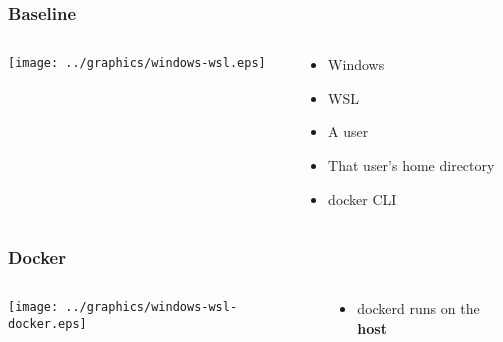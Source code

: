     \begin{frame}
      \frametitle{Baseline}
      \begin{columns}
        \begin{column}{0.5\textwidth}
          \texttt{[image: ../graphics/windows-wsl.eps]}
        \end{column}
        \begin{column}{0.5\textwidth}
          \begin{itemize}
          \item Windows\pause
          \item WSL\pause
          \item A user\pause
          \item That user's home directory\pause
          \item docker CLI
          \end{itemize}
        \end{column}
      \end{columns}
    \end{frame}

    \begin{frame}
      \frametitle{Docker}
      \begin{columns}
        \begin{column}{0.5\textwidth}
          \texttt{[image: ../graphics/windows-wsl-docker.eps]}
        \end{column}
        \begin{column}{0.5\textwidth}
          \begin{itemize}
          \item dockerd runs on the \textbf{host}
          \end{itemize}
        \end{column}
      \end{columns}
    \end{frame}

